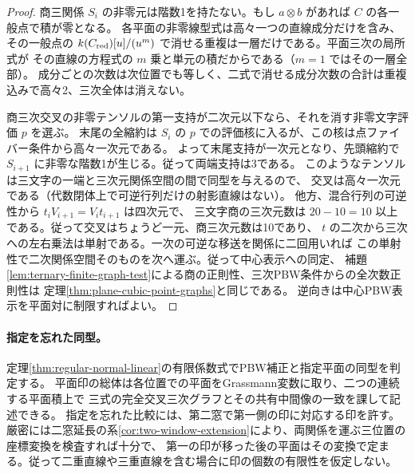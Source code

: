 \begin{proof}
商三関係 $S_i$ の非零元は階数1を持たない。もし $a\otimes b$ があれば $C$ の各一般点で積が零となる。
各平面の非零線型式は高々一つの直線成分だけを含み、その一般点の
$k(C_{\rm red})[u]/(u^m)$ で消せる重複は一層だけである。平面三次の局所式が
その直線の方程式の $m$ 乗と単元の積だからである（$m=1$ ではその一層全部）。
成分ごとの次数は次位置でも等しく、二式で消せる成分次数の合計は重複込みで高々2、三次全体は消えない。

商三次交叉の非零テンソルの第一支持が二次元以下なら、それを消す非零文字評価 $p$ を選ぶ。
末尾の全縮約は $S_i$ の $p$ での評価核に入るが、この核は点ファイバー条件から高々一次元である。
よって末尾支持が一次元となり、先頭縮約で $S_{i+1}$ に非零な階数1が生じる。従って両端支持は3である。
このようなテンソルは三文字の一端と三次元関係空間の間で同型を与えるので、
交叉は高々一次元である（代数閉体上で可逆行列だけの射影直線はない）。
他方、混合行列の可逆性から $t_i V_{i+1}=V_i t_{i+1}$ は四次元で、
三文字商の三次元数は $20-10=10$ 以上である。従って交叉はちょうど一元、商三次元数は10であり、
$t$ の二次から三次への左右乗法は単射である。一次の可逆な移送を関係に二回用いれば
この単射性で二次関係空間そのものを次へ運ぶ。従って中心表示への同定、
補題\ref{lem:ternary-finite-graph-test}による商の正則性、三次PBW条件からの全次数正則性は
定理\ref{thm:plane-cubic-point-graphs}と同じである。
逆向きは中心PBW表示を平面対に制限すればよい。
\end{proof}

\paragraph{指定を忘れた同型。}
定理\ref{thm:regular-normal-linear}の有限係数式でPBW補正と指定平面の同型を判定する。
平面印の総体は各位置での平面をGrassmann変数に取り、二つの連続する平面積上で
三式の完全交叉三次グラフとその共有中間像の一致を課して記述できる。
指定を忘れた比較には、第二窓で第一側の印に対応する印を許す。
厳密には二窓延長の系\ref{cor:two-window-extension}により、両関係を運ぶ三位置の座標変換を検査すれば十分で、
第一の印が移った後の平面はその変換で定まる。従って二重直線や三重直線を含む場合に印の個数の有限性を仮定しない。
